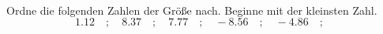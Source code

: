 \begin{aufgabe} ~ \\ 
Ordne die folgenden Zahlen der Gr\"o\ss{}e nach. Beginne mit der kleinsten Zahl.\[1.12\quad ; \quad8.37\quad ; \quad7.77\quad ; \quad-8.56\quad ; \quad-4.86\quad ; \quad\]\end{aufgabe} 
